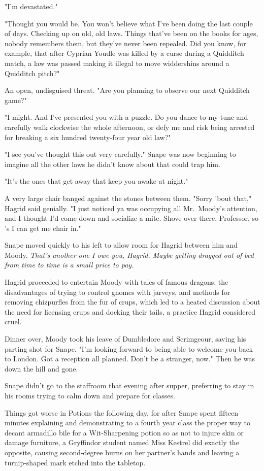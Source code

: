"I'm devastated."

"Thought you would be. You won't believe what I've been doing the last couple of days. Checking up on old, old laws. Things that've been on the books for ages, nobody remembers them, but they've never been repealed. Did you know, for example, that after Cyprian Youdle was killed by a curse during a Quidditch match, a law was passed making it illegal to move widdershins around a Quidditch pitch?"

An open, undisguised threat. "Are you planning to observe our next Quidditch game?"

"I might. And I've presented you with a puzzle. Do you dance to my tune and carefully walk clockwise the whole afternoon, or defy me and risk being arrested for breaking a six hundred twenty-four year old law?"

"I see you've thought this out very carefully." Snape was now beginning to imagine all the other laws he didn't know about that could trap him.

"It's the ones that get away that keep you awake at night."

A very large chair banged against the stones between them. "Sorry 'bout that," Hagrid said genially. "I just noticed ya was occupying all Mr.~Moody's attention, and I thought I'd come down and socialize a mite. Shove over there, Professor, so 's I can get me chair in."

Snape moved quickly to his left to allow room for Hagrid between him and Moody. \emph{That's another one I owe you, Hagrid. Maybe getting dragged out of bed from time to time is a small price to pay.}

Hagrid proceeded to entertain Moody with tales of famous dragons, the disadvantages of trying to control gnomes with jarveys, and methods for removing chizpurfles from the fur of crups, which led to a heated discussion about the need for licensing crups and docking their tails, a practice Hagrid considered cruel.

Dinner over, Moody took his leave of Dumbledore and Scrimgeour, saving his parting shot for Snape. "I'm looking forward to being able to welcome you back to London. Got a reception all planned. Don't be a stranger, now." Then he was down the hill and gone.

Snape didn't go to the staffroom that evening after supper, preferring to stay in his rooms trying to calm down and prepare for classes.

Things got worse in Potions the following day, for after Snape spent fifteen minutes explaining and demonstrating to a fourth year class the proper way to decant armadillo bile for a Wit-Sharpening potion so as not to injure skin or damage furniture, a Gryffindor student named Miss Kestrel did exactly the opposite, causing second-degree burns on her partner's hands and leaving a turnip-shaped mark etched into the tabletop.

